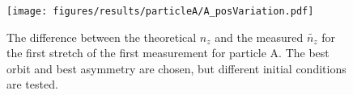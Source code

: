  
 \begin{figure}[H]
 \begin{center}
 \texttt{[image: figures/results/particleA/A\_posVariation.pdf]}
 \end{center}
 \caption{The difference between the theoretical $n_z$ and the measured $\widetilde{n_z}$ for the first stretch of the first measurement for particle A. The best orbit and best asymmetry are chosen, but different initial conditions are tested. }
 \label{fig:initVariation}
 \end{figure}
 
